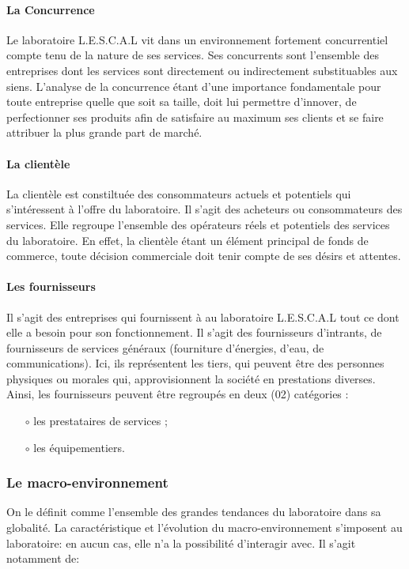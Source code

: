 \paragraph{La Concurrence}
Le laboratoire L.E.S.C.A.L vit dans un environnement fortement concurrentiel compte tenu de la nature de ses services. Ses concurrents sont l'ensemble des entreprises dont les services sont directement ou indirectement substituables aux siens.
L'analyse de la concurrence étant d'une importance fondamentale pour toute entreprise quelle que soit sa taille, doit lui permettre d'innover, de perfectionner ses produits afin de satisfaire au maximum ses clients et se faire attribuer la plus grande part de marché.

\paragraph{La clientèle}
La clientèle est constiltuée des consommateurs actuels et potentiels qui s'intéressent à 
l'offre du laboratoire. Il s'agit des acheteurs ou consommateurs des services. Elle regroupe 
l'ensemble des opérateurs réels et potentiels des services du laboratoire. En effet, la clientèle 
étant un élément principal de fonds de commerce, toute décision commerciale doit tenir compte de ses 
désirs et attentes.

\paragraph{Les fournisseurs}                                                                  
Il s'agit des entreprises qui fournissent à au laboratoire L.E.S.C.A.L tout ce dont elle
a besoin pour son fonctionnement. Il s'agit des fournisseurs d'intrants, de fournisseurs de 
services généraux (fourniture d'énergies, d'eau, de communications).
Ici, ils représentent les tiers, qui peuvent être des personnes physiques ou morales qui, approvisionnent
la société en prestations diverses.
Ainsi, les fournisseurs peuvent être regroupés en deux (02) catégories :	
\begin{itemize}
    \item[$\circ$] les prestataires de services ;
	\item[$\circ$] les équipementiers.
\end{itemize}		

\subsubsection{Le macro-environnement}
On le définit comme l'ensemble des grandes tendances du laboratoire dans sa globalité. 
La caractéristique et l'évolution du macro-environnement s'imposent au laboratoire: 
en aucun cas, elle n'a la possibilité d'interagir avec. Il s'agit notamment de:


